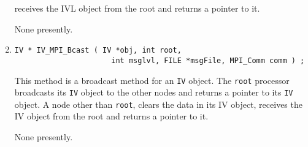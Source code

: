 \begin{enumerate}
receives the IVL object from the root
and returns a pointer to it.
\par {}
None presently.
\item
\begin{verbatim}
IV * IV_MPI_Bcast ( IV *obj, int root, 
                      int msglvl, FILE *msgFile, MPI_Comm comm ) ;
\end{verbatim}
This method is a broadcast method for an {\tt IV} object.
The {\tt root} processor broadcasts its {\tt IV} object to the
other nodes and returns a pointer to its {\tt IV} object.
A node other than {\tt root}, clears the data in its IV object,
receives the IV object from the root
and returns a pointer to it.
\par {}
None presently.
\end{enumerate}
\par
